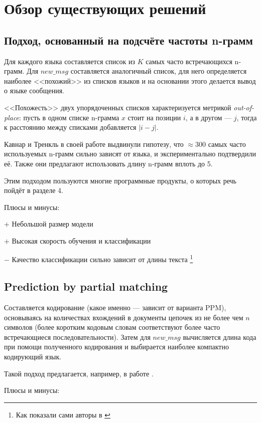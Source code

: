 \documentclass[a4paper, 14pt]{article}
\begin{document}
\pagebreak

\section{Обзор существующих решений}
		\subsection{Подход, основанный на подсчёте частоты n-грамм}
		Для каждого языка составляется список из $K$ самых часто встречающихся n-грамм. Для $new\_msg$ составляется аналогичный список, для него
		определяется наиболее <<похожий>> из списков языков
		и на основании этого делается вывод о языке сообщения. 
		
		<<Похожесть>> двух упорядоченных списков характеризуется метрикой \textit{out-of-place}: 
		пусть в одном списке n-грамма $x$ стоит на позиции $i$, а в другом \nolinebreak --- $j$, тогда к расстоянию между списками добавляется $|i - j|$.
		
		
		Кавнар и Тренкль в своей работе \cite{canvar} выдвинули гипотезу, что $ \approx 300$ самых часто используемых n-грамм сильно зависят
		от языка, и экспериментально подтвердили её. Также они предлагают использовать длину n-грамм вплоть до 5.
		
		Этим подходом пользуются многие программные продукты, о которых речь пойдёт
		в разделе 4.
		
		\noindent Плюсы и минусы:
		
		
		$+$ Небольшой размер модели
		
		$+$ Высокая скорость обучения и классификации
		
		$-$ Качество классификации сильно зависит от длины текста \footnote{Как показали сами авторы в \cite{canvar}}
		
		\subsection{Prediction by partial matching}
		Составляется кодирование (какое именно --- зависит от варианта PPM), основываясь на количествах вхождений в документы цепочек из не более чем $n$ символов (более коротким кодовым словам соответствуют более часто встречающиеся последовательности). Затем для $new\_msg$ вычисляется длина кода при помощи полученного кодирования и выбирается наиболее
		компактно кодирующий язык.
		
		Такой подход предлагается, например, в работе \cite{ppm}.
		
		\noindent Плюсы и минусы:
		
\end{document}
